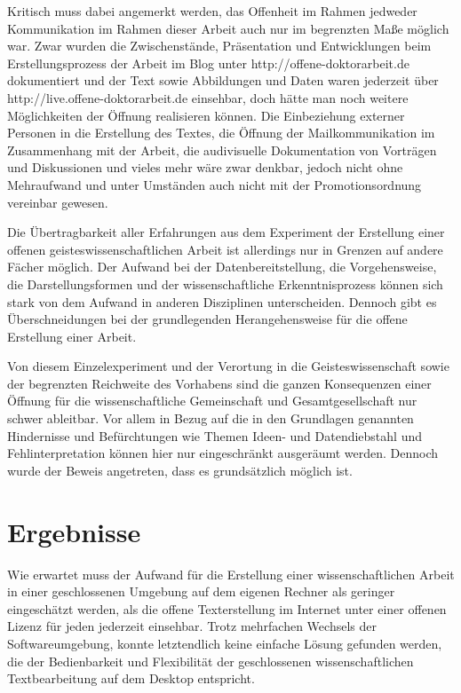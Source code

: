 Kritisch muss dabei angemerkt werden, das Offenheit im Rahmen jedweder Kommunikation im Rahmen dieser Arbeit auch nur im begrenzten Maße möglich war. Zwar wurden die Zwischenstände, Präsentation und Entwicklungen beim Erstellungsprozess der Arbeit im Blog unter http://offene-doktorarbeit.de dokumentiert und der Text sowie Abbildungen und Daten waren jederzeit über http://live.offene-doktorarbeit.de einsehbar, doch hätte man noch weitere Möglichkeiten der Öffnung realisieren können. Die Einbeziehung externer Personen in die Erstellung des Textes, die Öffnung der Mailkommunikation im Zusammenhang mit der Arbeit, die audivisuelle Dokumentation von Vorträgen und Diskussionen und vieles mehr wäre zwar denkbar, jedoch nicht ohne Mehraufwand und unter Umständen auch nicht mit der Promotionsordnung vereinbar gewesen.

Die Übertragbarkeit aller Erfahrungen aus dem Experiment der Erstellung einer offenen geisteswissenschaftlichen Arbeit ist allerdings nur in Grenzen auf andere Fächer möglich. Der Aufwand bei der Datenbereitstellung, die Vorgehensweise, die Darstellungsformen und der wissenschaftliche Erkenntnisprozess können sich stark von dem Aufwand in anderen Disziplinen unterscheiden. Dennoch gibt es Überschneidungen bei der grundlegenden Herangehensweise für die offene Erstellung einer Arbeit.

Von diesem Einzelexperiment und der Verortung in die Geisteswissenschaft sowie der begrenzten Reichweite des Vorhabens sind die ganzen Konsequenzen einer Öffnung für die wissenschaftliche Gemeinschaft und Gesamtgesellschaft nur schwer ableitbar. Vor allem in Bezug auf die in den Grundlagen genannten Hindernisse und Befürchtungen wie Themen Ideen- und Datendiebstahl und Fehlinterpretation können hier nur eingeschränkt ausgeräumt werden. Dennoch wurde der Beweis angetreten, dass es grundsätzlich möglich ist.

\section{Ergebnisse}

Wie erwartet muss der Aufwand für die Erstellung einer wissenschaftlichen Arbeit in einer geschlossenen Umgebung auf dem eigenen Rechner als geringer eingeschätzt werden, als die offene Texterstellung im Internet unter einer offenen Lizenz für jeden jederzeit einsehbar. Trotz mehrfachen Wechsels der Softwareumgebung, konnte letztendlich keine einfache Lösung gefunden werden, die der Bedienbarkeit und Flexibilität der geschlossenen wissenschaftlichen Textbearbeitung auf dem Desktop entspricht.

